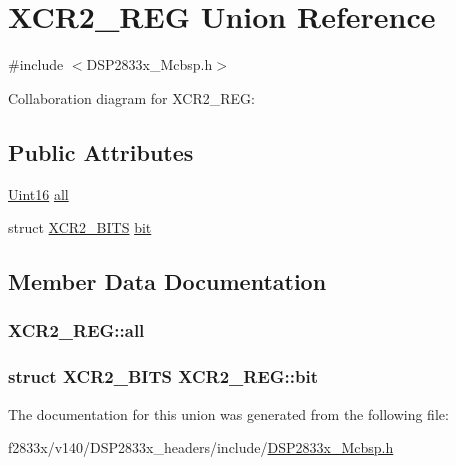 \hypertarget{union_x_c_r2___r_e_g}{}\section{X\+C\+R2\+\_\+\+R\+E\+G Union Reference}
\label{union_x_c_r2___r_e_g}


{\ttfamily \#include $<$D\+S\+P2833x\+\_\+\+Mcbsp.\+h$>$}



Collaboration diagram for X\+C\+R2\+\_\+\+R\+E\+G\+:
\subsection*{Public Attributes}
\begin{DoxyCompactItemize}
\item 
\hyperlink{_d_s_p2833x___device_8h_a59a9f6be4562c327cbfb4f7e8e18f08b}{Uint16} \hyperlink{union_x_c_r2___r_e_g_a80a4ce4b2e6f5feef0ad6746ea8d2584}{all}
\item 
struct \hyperlink{struct_x_c_r2___b_i_t_s}{X\+C\+R2\+\_\+\+B\+I\+T\+S} \hyperlink{union_x_c_r2___r_e_g_ad770d7c461f1bc88673a8ab1c8c547fb}{bit}
\end{DoxyCompactItemize}


\subsection{Member Data Documentation}
\hypertarget{union_x_c_r2___r_e_g_a80a4ce4b2e6f5feef0ad6746ea8d2584}{}
\subsubsection[{all}]{ X\+C\+R2\+\_\+\+R\+E\+G\+::all}\label{union_x_c_r2___r_e_g_a80a4ce4b2e6f5feef0ad6746ea8d2584}
\hypertarget{union_x_c_r2___r_e_g_ad770d7c461f1bc88673a8ab1c8c547fb}{}
\subsubsection[{bit}]{\setlength{\rightskip}{0pt plus 5cm}struct {\bf X\+C\+R2\+\_\+\+B\+I\+T\+S} X\+C\+R2\+\_\+\+R\+E\+G\+::bit}\label{union_x_c_r2___r_e_g_ad770d7c461f1bc88673a8ab1c8c547fb}


The documentation for this union was generated from the following file\+:\begin{DoxyCompactItemize}
\item 
f2833x/v140/\+D\+S\+P2833x\+\_\+headers/include/\hyperlink{_d_s_p2833x___mcbsp_8h}{D\+S\+P2833x\+\_\+\+Mcbsp.\+h}\end{DoxyCompactItemize}
